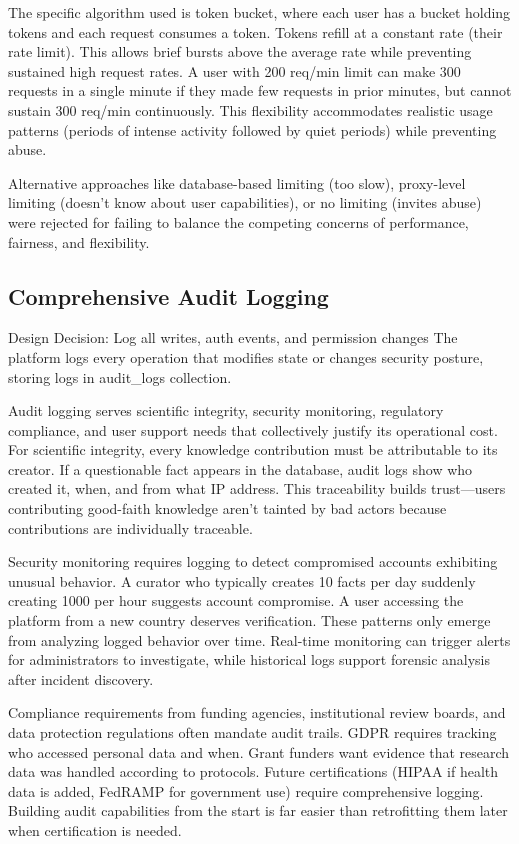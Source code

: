 \documentclass[12pt,a4paper]{article}
\begin{document}
The specific algorithm used is token bucket, where each user has a bucket holding tokens and each request consumes a token. Tokens refill at a constant rate (their rate limit). This allows brief bursts above the average rate while preventing sustained high request rates. A user with 200 req/min limit can make 300 requests in a single minute if they made few requests in prior minutes, but cannot sustain 300 req/min continuously. This flexibility accommodates realistic usage patterns (periods of intense activity followed by quiet periods) while preventing abuse.

Alternative approaches like database-based limiting (too slow), proxy-level limiting (doesn't know about user capabilities), or no limiting (invites abuse) were rejected for failing to balance the competing concerns of performance, fairness, and flexibility.

\subsection{Comprehensive Audit Logging}

\begin{rationale}{Design Decision: Log all writes, auth events, and permission changes}
The platform logs every operation that modifies state or changes security posture, storing logs in audit\_logs collection.
\end{rationale}

Audit logging serves scientific integrity, security monitoring, regulatory compliance, and user support needs that collectively justify its operational cost. For scientific integrity, every knowledge contribution must be attributable to its creator. If a questionable fact appears in the database, audit logs show who created it, when, and from what IP address. This traceability builds trust—users contributing good-faith knowledge aren't tainted by bad actors because contributions are individually traceable.

Security monitoring requires logging to detect compromised accounts exhibiting unusual behavior. A curator who typically creates 10 facts per day suddenly creating 1000 per hour suggests account compromise. A user accessing the platform from a new country deserves verification. These patterns only emerge from analyzing logged behavior over time. Real-time monitoring can trigger alerts for administrators to investigate, while historical logs support forensic analysis after incident discovery.

Compliance requirements from funding agencies, institutional review boards, and data protection regulations often mandate audit trails. GDPR requires tracking who accessed personal data and when. Grant funders want evidence that research data was handled according to protocols. Future certifications (HIPAA if health data is added, FedRAMP for government use) require comprehensive logging. Building audit capabilities from the start is far easier than retrofitting them later when certification is needed.
\end{document}
